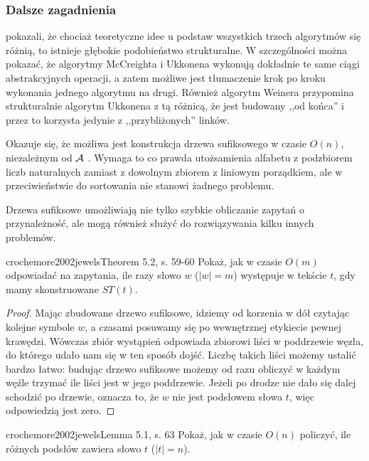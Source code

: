\subsubsection{Dalsze zagadnienia}

\citet{giegerich1997ukkonen} pokazali, że chociaż teoretyczne idee u podstaw wszystkich trzech algorytmów się różnią, to istnieje głębokie podobieństwo strukturalne. W szczególności można pokazać, że algorytmy McCreighta i Ukkonena wykonują dokładnie te same ciągi abstrakcyjnych operacji, a zatem możliwe jest tłumaczenie krok po kroku wykonania jednego algorytmu na drugi. Również algorytm Weinera przypomina strukturalnie algorytm Ukkonena z tą różnicą, że jest budowany ,,od końca'' i przez to korzysta jedynie z ,,przybliżonych'' linków.

Okazuje się, że możliwa jest konstrukcja drzewa sufiksowego w czasie $O(n)$, niezależnym od $\operatorname{\mathcal{A}}$ \citep{farach1997optimal}. Wymaga to co prawda utożsamienia alfabetu z podzbiorem liczb naturalnych zamiast z dowolnym zbiorem z liniowym porządkiem, ale w przeciwieństwie do sortowania nie stanowi żadnego problemu.

Drzewa sufiksowe umożliwiają nie tylko szybkie obliczanie zapytań o przynależność, ale mogą również służyć do rozwiązywania kilku innych problemów.

\begin{problem}{crochemore2002jewels}{Theorem 5.2, s. 59-60}
  Pokaż, jak w czasie $O(m)$ odpowiadać na zapytania, ile razy słowo $w$ ($|w| = m$) występuje w tekście $t$, gdy mamy skonstruowane $ST(t)$.
\end{problem}

\begin{proof}
Mając zbudowane drzewo sufiksowe, idziemy od korzenia w dół czytając kolejne symbole $w$, a czasami posuwamy się po wewnętrznej etykiecie pewnej krawędzi. Wówczas zbiór wystąpień odpowiada zbiorowi liści w poddrzewie węzła, do którego udało nam się w ten sposób dojść. Liczbę takich liści możemy ustalić bardzo łatwo: budując drzewo sufiksowe możemy od razu obliczyć w każdym węźle trzymać ile liści jest w jego poddrzewie. Jeżeli po drodze nie dało się dalej schodzić po drzewie, oznacza to, że $w$ nie jest podsłowem słowa $t$, więc odpowiedzią jest zero.
\end{proof}

\begin{problem}{crochemore2002jewels}{Lemma 5.1, s. 63}
  Pokaż, jak w czasie $O(n)$ policzyć, ile różnych podsłów zawiera słowo $t$ ($|t| = n$).
\end{problem}

